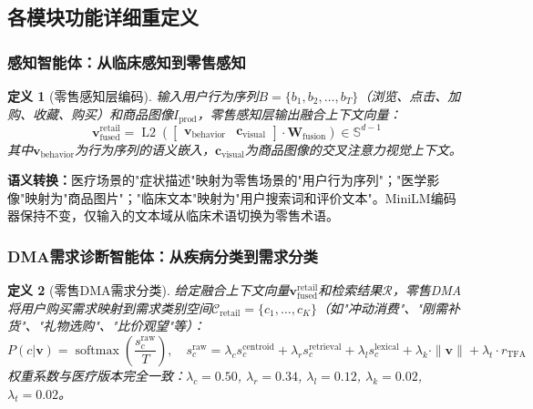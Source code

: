 \documentclass[11pt,a4paper]{ctexart}
\newtheorem{definition}{定义}[section]
\theoremstyle{remark}
\DeclareMathOperator{\softmax}{softmax}
\DeclareMathOperator{\Ltwo}{L2}
\begin{document}
\subsection{各模块功能详细重定义}

\subsubsection{感知智能体：从临床感知到零售感知}

\begin{definition}[零售感知层编码]
输入用户行为序列$B = \{b_1, b_2, \ldots, b_T\}$（浏览、点击、加购、收藏、购买）和商品图像$I_{\text{prod}}$，零售感知层输出融合上下文向量：
\begin{equation}
\mathbf{v}_{\text{fused}}^{\text{retail}} = \Ltwo\left(\begin{bmatrix} \mathbf{v}_{\text{behavior}} & \mathbf{c}_{\text{visual}} \end{bmatrix} \cdot \mathbf{W}_{\text{fusion}}\right) \in \mathbb{S}^{d-1}
\end{equation}
其中$\mathbf{v}_{\text{behavior}}$为行为序列的语义嵌入，$\mathbf{c}_{\text{visual}}$为商品图像的交叉注意力视觉上下文。
\end{definition}

\textbf{语义转换：}医疗场景的"症状描述"映射为零售场景的"用户行为序列"；"医学影像"映射为"商品图片"；"临床文本"映射为"用户搜索词和评价文本"。MiniLM编码器保持不变，仅输入的文本域从临床术语切换为零售术语。

\subsubsection{DMA需求诊断智能体：从疾病分类到需求分类}

\begin{definition}[零售DMA需求分类]
给定融合上下文向量$\mathbf{v}_{\text{fused}}^{\text{retail}}$和检索结果$\mathcal{R}$，零售DMA将用户购买需求映射到需求类别空间$\mathcal{C}_{\text{retail}} = \{c_1, \ldots, c_K\}$（如"冲动消费"、"刚需补货"、"礼物选购"、"比价观望"等）：
\begin{equation}
P(c|\mathbf{v}) = \softmax\left(\frac{s_c^{\text{raw}}}{T}\right), \quad s_c^{\text{raw}} = \lambda_c s_c^{\text{centroid}} + \lambda_r s_c^{\text{retrieval}} + \lambda_l s_c^{\text{lexical}} + \lambda_k \cdot \|\mathbf{v}\| + \lambda_t \cdot r_{\text{TFA}}
\end{equation}
权重系数与医疗版本完全一致：$\lambda_c=0.50$, $\lambda_r=0.34$, $\lambda_l=0.12$, $\lambda_k=0.02$, $\lambda_t=0.02$。
\end{definition}
\end{document}
